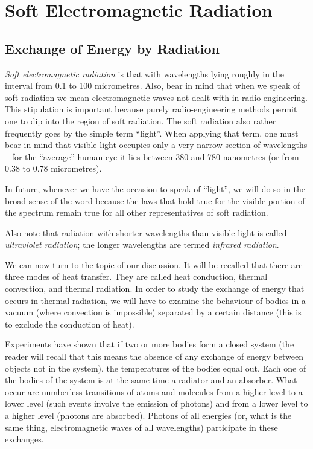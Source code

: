 

\cleardoublepage
\chapter{Soft Electromagnetic Radiation}
\label{ch-01}

\section{Exchange of Energy by Radiation}
\emph{Soft electromagnetic radiation} is that with wavelengths lying roughly in the interval from 0.1 to 100 micrometres. Also, bear in mind that when we speak of soft radiation we mean electromagnetic waves not dealt with in radio engineering. This stipulation is important because purely radio-engineering methods permit one to dip into the region of soft radiation. The soft radiation also rather frequently goes by the simple term ``light''. When applying that term, one must bear in mind that visible light occupies only a very narrow section of wavelengths -- for the ``average'' human eye it lies between 380 and 780 nanometres (or from 0.38 to 0.78 micrometres).

In future, whenever we have the occasion to speak of ``light'', we will do so in the broad sense of the word because the laws that hold true for the visible portion of the spectrum remain true for all other representatives of soft radiation.

Also note that radiation with shorter wavelengths than visible light is called \emph{ultraviolet radiation}; the longer wavelengths are termed \emph{infrared radiation}.

We can now turn to the topic of our discussion. It will be recalled that there are three modes of heat transfer. They are called heat conduction, thermal convection,
and thermal radiation. In order to study the exchange of energy that occurs in thermal radiation, we will have to  examine the behaviour of bodies in a vacuum (where convection is impossible) separated by a certain distance (this is to exclude the conduction of heat).

Experiments have shown that if two or more bodies form a closed system (the reader will recall that this means the absence of any exchange of energy between objects not in the system), the temperatures of the bodies equal out. Each one of the bodies of the system is at the same time a radiator and an absorber. What occur are numberless transitions of atoms and molecules from a higher level to a lower level (such events involve the emission of photons) and from a lower level to a higher level (photons are absorbed). Photons of all energies (or, what is the same thing, electromagnetic waves of all wavelengths) participate in these exchanges.


